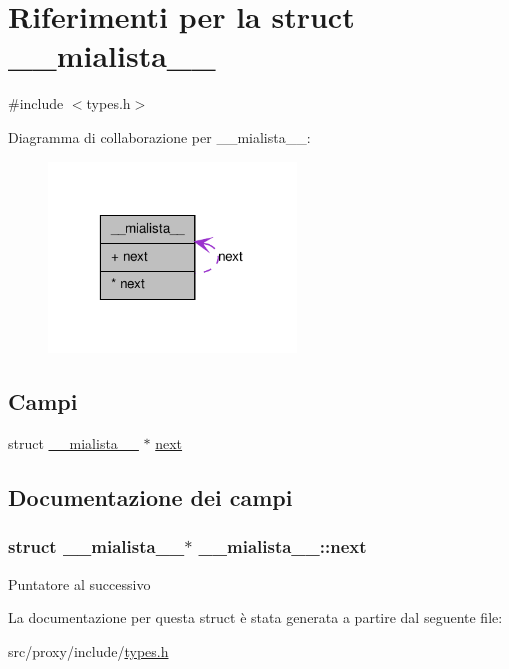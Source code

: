 \hypertarget{struct____mialista____}{
\section{Riferimenti per la struct \_\-\_\-mialista\_\-\_\-}
\label{struct____mialista____}
}


{\ttfamily \#include $<$types.h$>$}



Diagramma di collaborazione per \_\-\_\-mialista\_\-\_\-:
\nopagebreak
\begin{figure}[H]
\begin{center}
\leavevmode
\includegraphics[width=187pt]{struct____mialista______coll__graph}
\end{center}
\end{figure}
\subsection*{Campi}
{\bf }\par
\begin{DoxyCompactItemize}
\item 
struct \hyperlink{struct____mialista____}{\_\-\_\-mialista\_\-\_\-} $\ast$ \hyperlink{struct____mialista_____aab946fc138a0f007cffc45a8027e828d}{next}
\end{DoxyCompactItemize}



\subsection{Documentazione dei campi}
\hypertarget{struct____mialista_____aab946fc138a0f007cffc45a8027e828d}{
\subsubsection[{next}]{\setlength{\rightskip}{0pt plus 5cm}struct {\bf \_\-\_\-mialista\_\-\_\-}$\ast$ {\bf \_\-\_\-mialista\_\-\_\-::next}}}
\label{struct____mialista_____aab946fc138a0f007cffc45a8027e828d}
Puntatore al successivo 

La documentazione per questa struct è stata generata a partire dal seguente file:\begin{DoxyCompactItemize}
\item 
src/proxy/include/\hyperlink{types_8h}{types.h}\end{DoxyCompactItemize}

